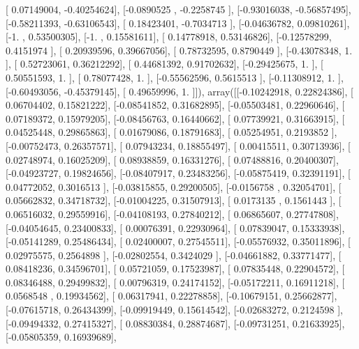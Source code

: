 \documentclass{article}
\begin{document}
       [ 0.07149004, -0.40254624],
       [-0.0890525 , -0.2258745 ],
       [-0.93016038, -0.56857495],
       [-0.58211393, -0.63106543],
       [ 0.18423401, -0.7034713 ],
       [-0.04636782,  0.09810261],
       [-1.        ,  0.53500305],
       [-1.        ,  0.15581611],
       [ 0.14778918,  0.53146826],
       [-0.12578299,  0.4151974 ],
       [ 0.20939596,  0.39667056],
       [ 0.78732595,  0.8790449 ],
       [-0.43078348,  1.        ],
       [ 0.52723061,  0.36212292],
       [ 0.44681392,  0.91702632],
       [-0.29425675,  1.        ],
       [ 0.50551593,  1.        ],
       [ 0.78077428,  1.        ],
       [-0.55562596,  0.5615513 ],
       [-0.11308912,  1.        ],
       [-0.60493056, -0.45379145],
       [ 0.49659996,  1.        ]]), array([[-0.10242918,  0.22824386],
       [ 0.06704402,  0.15821222],
       [-0.08541852,  0.31682895],
       [-0.05503481,  0.22960646],
       [ 0.07189372,  0.15979205],
       [-0.08456763,  0.16440662],
       [ 0.07739921,  0.31663915],
       [ 0.04525448,  0.29865863],
       [ 0.01679086,  0.18791683],
       [ 0.05254951,  0.2193852 ],
       [-0.00752473,  0.26357571],
       [ 0.07943234,  0.18855497],
       [ 0.00415511,  0.30713936],
       [ 0.02748974,  0.16025209],
       [ 0.08938859,  0.16331276],
       [ 0.07488816,  0.20400307],
       [-0.04923727,  0.19824656],
       [-0.08407917,  0.23483256],
       [-0.05875419,  0.32391191],
       [ 0.04772052,  0.3016513 ],
       [-0.03815855,  0.29200505],
       [-0.0156758 ,  0.32054701],
       [ 0.05662832,  0.34718732],
       [-0.01004225,  0.31507913],
       [ 0.0173135 ,  0.1561443 ],
       [ 0.06516032,  0.29559916],
       [-0.04108193,  0.27840212],
       [ 0.06865607,  0.27747808],
       [-0.04054645,  0.23400833],
       [ 0.00076391,  0.22930964],
       [ 0.07839047,  0.15333938],
       [-0.05141289,  0.25486434],
       [ 0.02400007,  0.27545511],
       [-0.05576932,  0.35011896],
       [ 0.02975575,  0.2564898 ],
       [-0.02802554,  0.3424029 ],
       [-0.04661882,  0.33771477],
       [ 0.08418236,  0.34596701],
       [ 0.05721059,  0.17523987],
       [ 0.07835448,  0.22904572],
       [ 0.08346488,  0.29499832],
       [ 0.00796319,  0.24174152],
       [-0.05172211,  0.16911218],
       [ 0.0568548 ,  0.19934562],
       [ 0.06317941,  0.22278858],
       [-0.10679151,  0.25662877],
       [-0.07615718,  0.26434399],
       [-0.09919449,  0.15614542],
       [-0.02683272,  0.2124598 ],
       [-0.09494332,  0.27415327],
       [ 0.08830384,  0.28874687],
       [-0.09731251,  0.21633925],
       [-0.05805359,  0.16939689],
\end{document}
